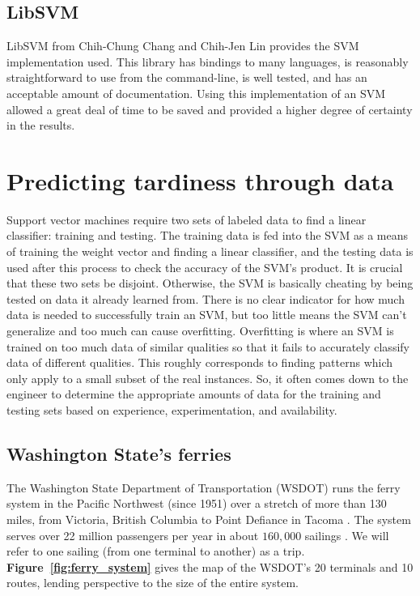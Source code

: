 \documentclass[11pt]{article} %
\begin{document}
\subsection{LibSVM}
\label{sec:libsvm}
LibSVM \cite{chang2011libsvm} from Chih-Chung Chang and Chih-Jen Lin provides the
SVM implementation used.  This library has bindings to many languages, is reasonably
straightforward to use from the command-line, is well tested, and has an acceptable
amount of documentation. Using this implementation of an SVM allowed a great deal
of time to be saved and provided a higher degree of certainty in the results.

\section{Predicting tardiness through data}
\label{sec:problem}
Support vector machines require two sets of labeled data to find a linear classifier:
training and testing. The training data is fed into the SVM as a means of training
the weight vector and finding a linear classifier, and the testing data is used
after this process to check the accuracy of the SVM's product. It is crucial that
these two sets be disjoint. Otherwise, the SVM is basically cheating by being
tested on data it already learned from. There is no clear indicator for how much data
is needed to successfully train an SVM, but too little means the SVM can't 
generalize and too much can cause overfitting. Overfitting is where an SVM is
trained on too much data of similar qualities so that it fails to accurately
classify data of different qualities. This roughly corresponds to finding patterns
which only apply to a small subset of the real instances.  So, it often comes
down to the engineer to determine the appropriate amounts of data for the training
and testing sets based on experience, experimentation, and availability.



\subsection{Washington State's ferries}
\label{sec:wsdot}
The Washington State Department of Transportation (WSDOT) runs the ferry system
in the Pacific Northwest (since 1951) over a stretch of more than 130 miles, from 
Victoria, British Columbia to Point Defiance in Tacoma \cite{wsdotFleet}. The system 
serves over 22 million passengers per year in about $160,000$ sailings 
\cite{wsfTraffic}.  We will refer to one sailing (from one terminal to another) as a 
trip.  \textbf{Figure~\ref{fig:ferry_system}} gives the map of the WSDOT's 20 
terminals and 10 routes, lending perspective to the size of the entire system.
\end{document}
